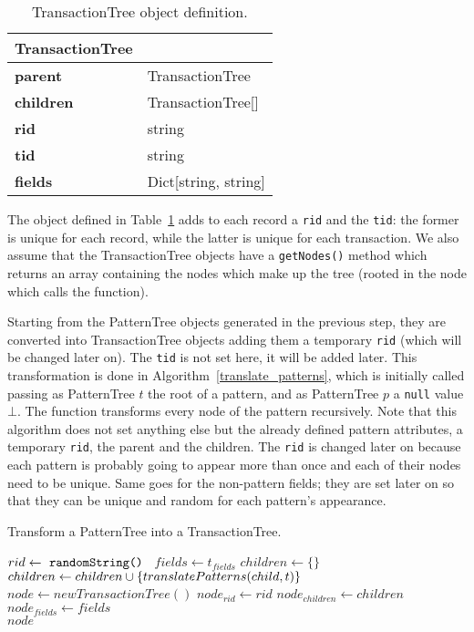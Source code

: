 \documentclass{acm_proc_article-sp-sigmod09}
\begin{document}
\begin{table}[H]
\centering
\begin{tabular}{|ll|} \hline
\textbf{TransactionTree} & \\ \hline
\textbf{parent} & TransactionTree \\ \hline
\textbf{children} & TransactionTree[] \\ \hline
\textbf{rid} & string \\ \hline
\textbf{tid} & string \\ \hline
\textbf{fields} & Dict[string, string] \\
\hline\end{tabular}
\caption{TransactionTree object definition.}
\label{tab:transactiontree}
\end{table}

The object defined in Table~\ref{tab:transactiontree} adds to each record a \texttt{rid} and the \texttt{tid}: the former is unique for each record, while the latter is unique for each transaction. We also assume that the TransactionTree objects have a \texttt{getNodes()} method which returns an array containing the nodes which make up the tree (rooted in the node which calls the function).

Starting from the PatternTree objects generated in the previous step, they are converted into TransactionTree objects adding them a temporary \texttt{rid} (which will be changed later on). The \texttt{tid} is not set here, it will be added later. This transformation is done in Algorithm~\ref{translate_patterns}, which is initially called passing as PatternTree $t$ the root of a pattern, and as PatternTree $p$ a \texttt{null} value $\bot$. The function transforms every node of the pattern recursively. Note that this algorithm does not set anything else but the already defined pattern attributes, a temporary \texttt{rid}, the parent and the children. The \texttt{rid} is changed later on because each pattern is probably going to appear more than once and each of their nodes need to be unique. Same goes for the non-pattern fields; they are set later on so that they can be unique and random for each pattern's appearance. 

\begin{algorithm}
\caption{Transform a PatternTree into a TransactionTree.}
\label{translate_patterns}
\begin{algorithmic}[1]
\State $rid \gets \text{ \texttt{randomString() }}$
\State $fields \gets t_{fields}$
\State $children \gets \{\}$
	\State $children \gets children \cup \{translate\-Patterns(child, t)\}$
\EndFor
\State $node \gets new TransactionTree()$
\State $node_{rid} \gets rid$
\State $node_{children} \gets children$
\State $node_{fields} \gets fields$ \\
\Return $node$
\EndFunction
\end{algorithmic}
\end{algorithm}
\end{document}
